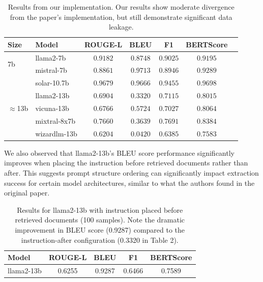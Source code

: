 \documentclass[10pt,letterpaper]{article}
\begin{document}
\begin{table}[ht]
\centering
\small
\begin{tabular}{@{}llccccc@{}}
\toprule
\textbf{Size} & \textbf{Model} & \textbf{ROUGE-L} & \textbf{BLEU} & \textbf{F1} & \textbf{BERTScore} \\
\midrule
\multirow{2}{*}{7b}
& llama2-7b & $\mathbf{0.9182}$ & $0.8748$ & $\mathbf{0.9025}$ & $0.9195$ \\
& mistral-7b & $0.8861$ & $\mathbf{0.9713}$ & $0.8946$ & $\mathbf{0.9289}$ \\
\midrule
\multirow{5}{*}{$\approx$13b}
& solar-10.7b & $\mathbf{0.9679}$ & $\mathbf{0.9666}$ & $\mathbf{0.9455}$ & $\mathbf{0.9698}$ \\
& llama2-13b & $0.6904$ & $0.3320$ & $0.7115$ & $0.8015$ \\
& vicuna-13b & $0.6766$ & $0.5724$ & $0.7027$ & $0.8064$ \\
& mixtral-8x7b & $0.7660$ & $0.3639$ & $0.7691$ & $0.8384$ \\
& wizardlm-13b & $0.6204$ & $0.0420$ & $0.6385$ & $0.7583$ \\
\bottomrule
\end{tabular}
\caption{Results from our implementation. Our results show moderate divergence from the paper's implementation, but still demonstrate significant data leakage.}
\label{tab:initial_results}
\end{table}

We also observed that llama2-13b's BLEU score performance significantly improves when placing the instruction before retrieved documents rather than after. This suggests prompt structure ordering can significantly impact extraction success for certain model architectures, similar to what the authors found in the original paper.

\begin{table}[ht]
\centering
\small
\begin{tabular}{@{}lcccc@{}}
\toprule
\textbf{Model} & \textbf{ROUGE-L} & \textbf{BLEU} & \textbf{F1} & \textbf{BERTScore} \\
\midrule
llama2-13b & 0.6255 & 0.9287 & 0.6466 & 0.7589 \\
\bottomrule
\end{tabular}
\caption{Results for llama2-13b with instruction placed before retrieved documents (100 samples). Note the dramatic improvement in BLEU score (0.9287) compared to the instruction-after configuration (0.3320 in Table 2).}
\label{tab:instruction_ordering}
\end{table}
\end{document}

